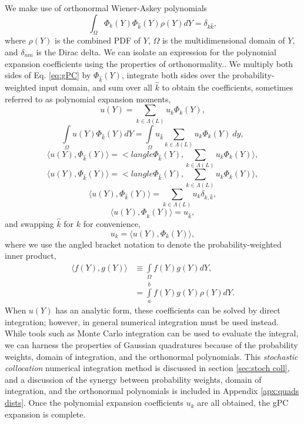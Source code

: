 We make use of orthonormal Wiener-Askey polynomials
\begin{equation}
  \int_\Omega \Phi_k(Y)\Phi_{\hat k}(Y) \rho(Y) dY = \delta_{k\hat k},
\end{equation}
where $\rho(Y)$ is the combined PDF of $Y$, $\Omega$ is the multidimensional domain of $Y$, and $\delta_{nm}$
is the Dirac delta.  We can isolate an expression for the polynomial expansion coefficients using the
properties of orthonormality..
We multiply both sides of Eq. \ref{eq:gPC} by
$\Phi_{\hat k}(Y)$, integrate both sides over the probability-weighted input domain, and sum over all $\hat k$
to obtain the coefficients, sometimes referred to as polynomial expansion moments,
\begin{equation}
  u(Y) = \sum_{k\in\Lambda(L)} u_k\Phi_k(Y),
\end{equation}
\begin{equation}
  \int\limits_\Omega u(Y)\Phi_{\hat k}(Y) dY = \int\limits_\Omega u_{\hat k} \sum_{k\in\Lambda(L)}
           u_k\Phi_k(Y)\ dy,
\end{equation}
\begin{equation}
  \langle u(Y),\Phi_{\hat k}(Y)\rangle = <langle \Phi_{\hat k}(Y),\sum_{k\in\Lambda(L)}
           u_k\Phi_k(Y) \rangle,
\end{equation}
\begin{equation}
  \langle u(Y),\Phi_{\hat k}(Y)\rangle = <langle \Phi_{\hat k}(Y),\sum_{k\in\Lambda(L)}
           u_k\Phi_k(Y) \rangle,
\end{equation}
\begin{equation}
  \langle u(Y),\Phi_{\hat k}(Y)\rangle = \sum_{k\in\Lambda(L)} u_k \delta_{k,\hat k},
\end{equation}
\begin{equation}
  \langle u(Y),\Phi_{\hat k}(Y)\rangle = u_{\hat k} ,
\end{equation}
and swapping $\hat k$ for $k$ for convenience,
\begin{equation}\label{eq:polycoeff}
  u_k = \langle u(Y),\Phi_k(Y) \rangle,
\end{equation}
where we use the angled bracket notation to denote the probability-weighted inner product,
\begin{align}
  \langle f(Y),g(Y) \rangle &\equiv \int\limits_\Omega f(Y)g(Y) dY, \\
    &= \int\limits_a^b f(Y)g(Y)\rho(Y) dY.
\end{align}
When $u(Y)$ has an analytic form, these coefficients can be solved by direct integration; however, in general
numerical integration must be used instead.  While tools such as Monte Carlo integration can
be used to evaluate the integral, we can harness the properties of Gaussian quadratures because of the
probability weights, domain of integration, and the orthonormal polynomials.
This \emph{stochastic collocation} numerical integration method is discussed in section \ref{sec:stoch
coll}, and a discussion of the synergy between probability weights, domain of integration, and the 
orthonormal polynomials is included in Appendix \ref{apx:quads dists}.  Once the polynomial expansion 
coefficients $u_k$ are all obtained, the gPC expansion is complete.

